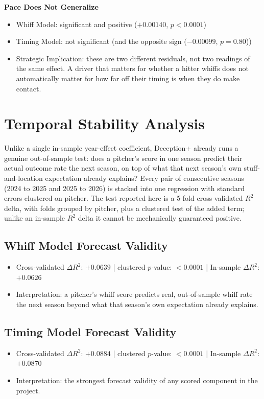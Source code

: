 \documentclass[11pt]{article}
\newcommand{\feat}[1]{\textbf{#1}}
\begin{document}
\feat{Pace Does Not Generalize}
\begin{itemize}
\item Whiff Model: significant and positive ($+0.00140$, $p<0.0001$)
\item Timing Model: not significant (and the opposite sign ($-0.00099$, $p=0.80$))
\item Strategic Implication: these are two different residuals, not two readings of the same effect. A driver that matters for whether a hitter whiffs does not automatically matter for how far off their timing is when they do make contact.
\end{itemize}

\section*{Temporal Stability Analysis}

Unlike a single in-sample year-effect coefficient, Deception+ already runs a genuine out-of-sample test: does a pitcher's score in one season predict their actual outcome rate the next season, on top of what that next season's own stuff-and-location expectation already explains? Every pair of consecutive seasons (2024 to 2025 and 2025 to 2026) is stacked into one regression with standard errors clustered on pitcher. The test reported here is a 5-fold cross-validated $R^2$ delta, with folds grouped by pitcher, plus a clustered test of the added term; unlike an in-sample $R^2$ delta it cannot be mechanically guaranteed positive.

\subsection*{Whiff Model Forecast Validity}
\begin{itemize}
\item Cross-validated $\Delta R^2$: $+0.0639$ \;|\; clustered $p$-value: $<0.0001$ \;|\; In-sample $\Delta R^2$: $+0.0626$
\item Interpretation: a pitcher's whiff score predicts real, out-of-sample whiff rate the next season beyond what that season's own expectation already explains.
\end{itemize}

\subsection*{Timing Model Forecast Validity}
\begin{itemize}
\item Cross-validated $\Delta R^2$: $+0.0884$ \;|\; clustered $p$-value: $<0.0001$ \;|\; In-sample $\Delta R^2$: $+0.0870$
\item Interpretation: the strongest forecast validity of any scored component in the project.
\end{itemize}
\end{document}
